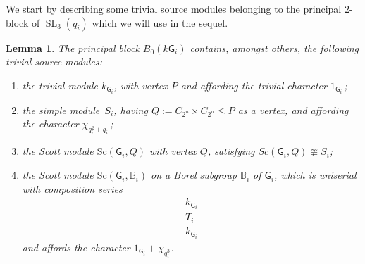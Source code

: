 \documentclass[12pt,a4paper]{amsart}
\theoremstyle{plain}\newtheorem{Theorem}{Theorem}[section]
\theoremstyle{plain}\newtheorem{Conjecture}[Theorem]{Conjecture}
\theoremstyle{plain}\newtheorem{Corollary}[Theorem]{Corollary}
\theoremstyle{plain}\newtheorem{Lemma}[Theorem]{Lemma}
\theoremstyle{plain}\newtheorem{Proposition}[Theorem]{Proposition}
\theoremstyle{definition}\newtheorem{Definition}[Theorem]{Definition}
\theoremstyle{definition}\newtheorem{Example}[Theorem]{Example}
\theoremstyle{definition}\newtheorem{Examples}[Theorem]{Examples}
\theoremstyle{definition}\newtheorem{Remark}[Theorem]{Remark}
\theoremstyle{definition}\newtheorem{Question}[Theorem]{Question}
\theoremstyle{definition}\newtheorem{Notation}[Theorem]{Notation}
\theoremstyle{definition}\newtheorem{Hypothesis}[Theorem]{Hypothesis}
\theoremstyle{definition}\newtheorem{Assumption}[Theorem]{Assumption}
\theoremstyle{definition}\newtheorem{Strategy}[Theorem]{Strategy}
\theoremstyle{definition}\newtheorem{Contents}[Theorem]{Contents}
\theoremstyle{definition}\newtheorem{Computations}[Theorem]{Computations}
\theoremstyle{definition}\newtheorem{Equivalences}[Theorem]{Equivalences}
\theoremstyle{definition}\newtheorem{Notation/Definition}[Theorem]{Notation/Definition}
\theoremstyle{definition}\newtheorem{noth}[Theorem]{}
\theoremstyle{plain}\newtheorem{Step}[Theorem]{Step}
\newcommand{\SL}{\operatorname{SL}}
\newcommand{\Sc}{{\text{Sc}}}
\begin{document}
We start by describing some trivial source modules belonging to the principal $2$-block of $\SL_{3}(q_{i})$ which we will use in the sequel. 

\begin{Lemma}\label{lem:tsPSL_{3}(q)}%
The principal block $B_{0}(k\mathsf{G}_{i})$ contains, amongst others, the following trivial source modules:
\begin{enumerate}
\item[\rm(a)] the trivial module $k_{\mathsf{G}_{i}}$, with vertex $P$ and affording the trivial character $1_{ \mathsf{G}_{i} }$\,;
\item[\rm(b)] the simple module~$S_{i}$, having  $Q:=C_{2^n}\times C_{2^n}\leq P$ as a vertex, and affording the character $\chi^{}_{q_{i}^2+q_{i}}$\,;
\item[\rm(c)] the Scott module $\Sc(\mathsf{G}_{i},Q)$ with vertex $Q$, satisfying $Sc(\mathsf{G}_{i},Q)\ncong S_{i}$;
\item[\rm(d)] the Scott module $\Sc(\mathsf{G}_{i},\mathbb B_{i})$ on a Borel subgroup $\mathbb B_{i}$ of $\mathsf G_{i}$,
which is uniserial with composition series 
$$
\boxed{\begin{matrix}k_{\mathsf{G}_{i}}\\ T_{i}\\ k_{\mathsf{G}_{i}}\end{matrix}}
$$ 
and affords the character $1_{\mathsf{G}_{i}}+\chi_{q_{i}^3}$.
\end{enumerate}
\end{Lemma}
\end{document}
